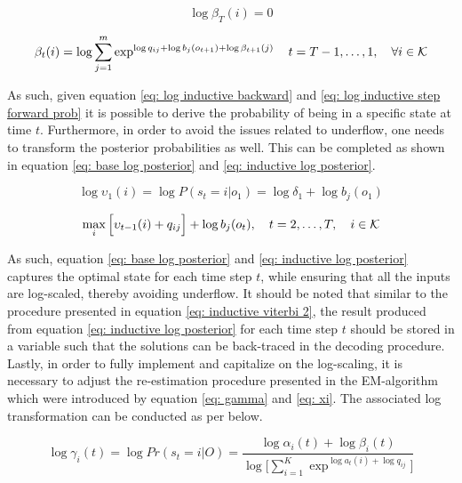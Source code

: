 \begin{equation}
     \log\beta_T(i) = 0
    \label{eq: log base backward}
\end{equation}

\begin{equation}
    \beta_t(i) = \log\sum_{j=1}^m \exp^{\log q_{ij}+\log b_j(o_{t+1})+\log \beta_{t+1}(j)}
    \quad t=T-1,\ldots,1, 
    \quad \forall i \in\operatorname{\mathcal{K}}
    \label{eq: log inductive backward}
\end{equation}

As such, given equation \ref{eq: log inductive backward} and \ref{eq: log inductive step forward prob} it is possible to derive the probability of being in a specific state at time $t$. Furthermore, in order to avoid the issues related to underflow, one needs to transform the posterior probabilities as well. This can be completed as shown in equation \ref{eq: base log posterior} and \ref{eq: inductive log posterior}.

\begin{equation}
    \log \upsilon_1(i) = \log P(s_t=i | o_1) = \log \delta_1 + \log b_j(o_{1}) 
    \label{eq: base log posterior}
\end{equation}

\begin{equation}
    \max_{i} \Big[\upsilon_{t-1}(i) + q_{ij}\Big] + \log b_j(o_t),
    \quad t=2,\ldots,T,
    \quad i \in\operatorname{\mathcal{K}}
    \label{eq: inductive log posterior}
\end{equation}

As such, equation \ref{eq: base log posterior} and \ref{eq: inductive log posterior} captures the optimal state for each time step $t$, while ensuring that all the inputs are log-scaled, thereby avoiding underflow. It should be noted that similar to the procedure presented in equation \ref{eq: inductive viterbi 2}, the result produced from equation \ref{eq: inductive log posterior} for each time step $t$ should be stored in a variable such that the solutions can be back-traced in the decoding procedure. Lastly, in order to fully implement and capitalize on the log-scaling, it is necessary to adjust the re-estimation procedure presented in the EM-algorithm which were introduced by equation \ref{eq: gamma} and \ref{eq: xi}. The associated log transformation can be conducted as per below.

\begin{equation}
    \log\gamma_i(t) = \log Pr(s_t=i|O) =
    \frac{\log\alpha_i(t) + \log\beta_i(t)}{\log\Big[\sum_{i=1}^K \exp^{\log a_t(i)+\log q_{ij}}\Big]}  
    \label{eq: log gamma}
\end{equation}

